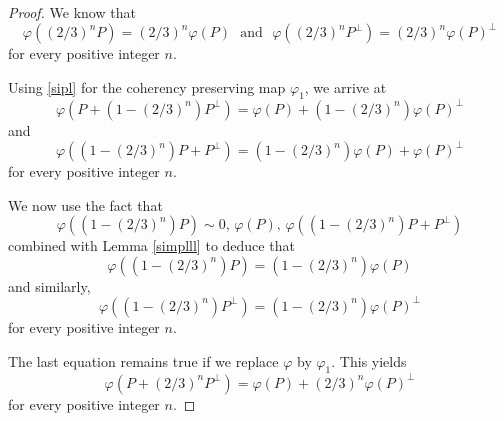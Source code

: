 \documentclass[10pt,a4paper]{amsart}
\theoremstyle{definition}
\theoremstyle{remark}
\numberwithin{subsection}{section}
\numberwithin{equation}{section}
\begin{document}
\begin{proof}
We know that
\begin{equation}\label{sipl}
\varphi ( (2/3)^n P ) = (2/3)^n \varphi (P) \ \ \ \text{and}  \ \ \ \varphi ( (2/3)^n P^\perp ) = (2/3)^n \varphi(P)^\perp
\end{equation}
for every positive integer $n$. 

Using \eqref{sipl} for the coherency preserving map $\varphi_1$, we arrive at
\[
\varphi ( P + (1-(2/3)^n ) P^\perp ) = \varphi (P) + (1-(2/3)^n) \varphi (P)^\perp 
\]
and 
\[
\varphi ( (1 -(2/3)^n ) P + P^\perp ) = (1 - (2/3)^n ) \varphi (P) + \varphi(P)^\perp
\]
for every positive integer $n$. 

We now use the fact that 
\[
\varphi ( (1-(2/3)^n ) P ) \sim 0,\, \varphi (P),\, \varphi ( (1 -(2/3)^n ) P + P^\perp )
\]
combined with Lemma \ref{simplll} to deduce that
\[
\varphi ( (1-(2/3)^n ) P ) = (1-(2/3)^n) \varphi ( P ) 
\]
and similarly, 
\[
\varphi ( (1 - (2/3)^n ) P^\perp ) = (1 - (2/3)^n ) \varphi(P)^\perp
\]
for every positive integer $n$. 

The last equation remains true if we replace $\varphi$ by $\varphi_1$.  This yields
\[
\varphi ( P +(2/3)^n  P^\perp ) = \varphi (P) + (2/3)^n \varphi (P)^\perp 
\]
for every positive integer $n$. 
\end{proof}
\end{document}
